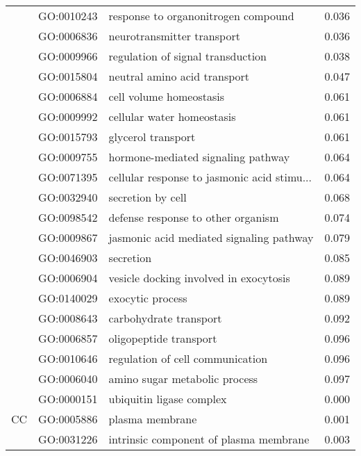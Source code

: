 \begin{longtable}{lllr}
   & GO:0010243 &          response to organonitrogen compound &         0.036 \\
   & GO:0006836 &                   neurotransmitter transport &         0.036 \\
   & GO:0009966 &            regulation of signal transduction &         0.038 \\
   & GO:0015804 &                 neutral amino acid transport &         0.047 \\
   & GO:0006884 &                      cell volume homeostasis &         0.061 \\
   & GO:0009992 &                   cellular water homeostasis &         0.061 \\
   & GO:0015793 &                           glycerol transport &         0.061 \\
   & GO:0009755 &           hormone-mediated signaling pathway &         0.064 \\
   & GO:0071395 &  cellular response to jasmonic acid stimu... &         0.064 \\
   & GO:0032940 &                            secretion by cell &         0.068 \\
   & GO:0098542 &           defense response to other organism &         0.074 \\
   & GO:0009867 &     jasmonic acid mediated signaling pathway &         0.079 \\
   & GO:0046903 &                                    secretion &         0.085 \\
   & GO:0006904 &       vesicle docking involved in exocytosis &         0.089 \\
   & GO:0140029 &                             exocytic process &         0.089 \\
   & GO:0008643 &                       carbohydrate transport &         0.092 \\
   & GO:0006857 &                       oligopeptide transport &         0.096 \\
   & GO:0010646 &             regulation of cell communication &         0.096 \\
   & GO:0006040 &                amino sugar metabolic process &         0.097 \\
\cline{1-4}
\multirow{15}{*}{CC} & GO:0000151 &                     ubiquitin ligase complex &         0.000 \\
   & GO:0005886 &                              plasma membrane &         0.001 \\
   & GO:0031226 &       intrinsic component of plasma membrane &         0.003 \\

\end{longtable}
